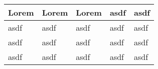 \documentclass[a4paper,40pt]{scrartcl}
\begin{document}
    \begin{landscape}
        \thispagestyle{empty}
        \noindent
        \centering
        \begin{tabularx}{\linewidth}{| X | X | X | X | X |}
            \hline
            Lorem & Lorem & Lorem & asdf & asdf \\ \hline
            asdf & asdf & asdf & asdf & asdf \\ \hline
            asdf & asdf & asdf & asdf & asdf \\ \hline
            asdf & asdf & asdf & asdf & asdf \\ \hline
        \end{tabularx}
    \end{landscape}
\end{document}
